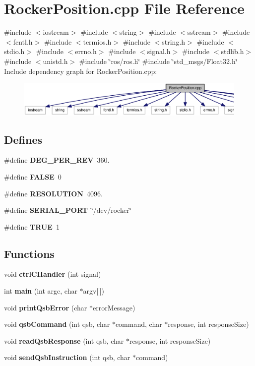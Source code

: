 \section{\-Rocker\-Position.\-cpp \-File \-Reference}
\label{RockerPosition_8cpp}
{\ttfamily \#include $<$iostream$>$}\*
{\ttfamily \#include $<$string$>$}\*
{\ttfamily \#include $<$sstream$>$}\*
{\ttfamily \#include $<$fcntl.\-h$>$}\*
{\ttfamily \#include $<$termios.\-h$>$}\*
{\ttfamily \#include $<$string.\-h$>$}\*
{\ttfamily \#include $<$stdio.\-h$>$}\*
{\ttfamily \#include $<$errno.\-h$>$}\*
{\ttfamily \#include $<$signal.\-h$>$}\*
{\ttfamily \#include $<$stdlib.\-h$>$}\*
{\ttfamily \#include $<$unistd.\-h$>$}\*
{\ttfamily \#include \char`\"{}ros/ros.\-h\char`\"{}}\*
{\ttfamily \#include \char`\"{}std\-\_\-msgs/\-Float32.\-h\char`\"{}}\*
\-Include dependency graph for \-Rocker\-Position.\-cpp\-:
\nopagebreak
\begin{figure}[H]
\begin{center}
\leavevmode
\includegraphics[width=350pt]{RockerPosition_8cpp__incl}
\end{center}
\end{figure}
\subsection*{\-Defines}
\begin{DoxyCompactItemize}
\item 
\#define {\bf \-D\-E\-G\-\_\-\-P\-E\-R\-\_\-\-R\-E\-V}~360.
\item 
\#define {\bf \-F\-A\-L\-S\-E}~0
\item 
\#define {\bf \-R\-E\-S\-O\-L\-U\-T\-I\-O\-N}~4096.
\item 
\#define {\bf \-S\-E\-R\-I\-A\-L\-\_\-\-P\-O\-R\-T}~\char`\"{}/dev/rocker\char`\"{}
\item 
\#define {\bf \-T\-R\-U\-E}~1
\end{DoxyCompactItemize}
\subsection*{\-Functions}
\begin{DoxyCompactItemize}
\item 
void {\bf ctrl\-C\-Handler} (int signal)
\item 
int {\bf main} (int argc, char $\ast$argv[$\,$])
\item 
void {\bf print\-Qsb\-Error} (char $\ast$error\-Message)
\item 
void {\bf qsb\-Command} (int qsb, char $\ast$command, char $\ast$response, int response\-Size)
\item 
void {\bf read\-Qsb\-Response} (int qsb, char $\ast$response, int response\-Size)
\item 
void {\bf send\-Qsb\-Instruction} (int qsb, char $\ast$command)
\end{DoxyCompactItemize}
